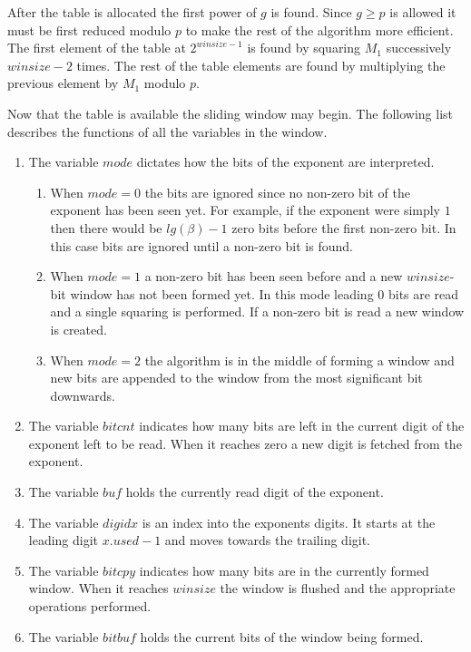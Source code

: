 \documentclass[b5paper]{book}
\begin{document}
After the table is allocated the first power of $g$ is found.  Since $g \ge p$ is allowed it must be first reduced modulo $p$ to make
the rest of the algorithm more efficient.  The first element of the table at $2^{winsize - 1}$ is found by squaring $M_1$ successively $winsize - 2$
times.  The rest of the table elements are found by multiplying the previous element by $M_1$ modulo $p$.

Now that the table is available the sliding window may begin.  The following list describes the functions of all the variables in the window.
\begin{enumerate}
\item The variable $mode$ dictates how the bits of the exponent are interpreted.  
\begin{enumerate}
   \item When $mode = 0$ the bits are ignored since no non-zero bit of the exponent has been seen yet.  For example, if the exponent were simply 
         $1$ then there would be $lg(\beta) - 1$ zero bits before the first non-zero bit.  In this case bits are ignored until a non-zero bit is found.  
   \item When $mode = 1$ a non-zero bit has been seen before and a new $winsize$-bit window has not been formed yet.  In this mode leading $0$ bits 
         are read and a single squaring is performed.  If a non-zero bit is read a new window is created.  
   \item When $mode = 2$ the algorithm is in the middle of forming a window and new bits are appended to the window from the most significant bit
         downwards.
\end{enumerate}
\item The variable $bitcnt$ indicates how many bits are left in the current digit of the exponent left to be read.  When it reaches zero a new digit
      is fetched from the exponent.
\item The variable $buf$ holds the currently read digit of the exponent. 
\item The variable $digidx$ is an index into the exponents digits.  It starts at the leading digit $x.used - 1$ and moves towards the trailing digit.
\item The variable $bitcpy$ indicates how many bits are in the currently formed window.  When it reaches $winsize$ the window is flushed and
      the appropriate operations performed.
\item The variable $bitbuf$ holds the current bits of the window being formed.  
\end{enumerate}
\end{document}
